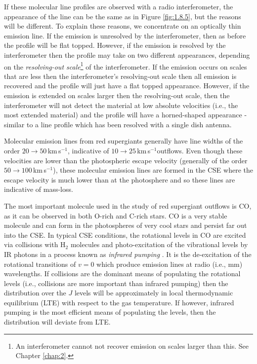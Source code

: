 If these molecular line profiles are observed with a radio interferometer, the appearance of the line can be the same as in Figure \ref{fig:1.8.5}, but the reasons will be different. To explain these reasons, we concentrate on an optically thin emission line. If the emission is unresolved by the interferometer, then as before the profile will be flat topped. However, if the emission is resolved by the interferometer then the profile may take on two different appearances, depending on the \textit{resolving-out scale}\footnote{ An interferometer cannot not recover emission on scales larger than this. See Chapter \ref{chap:2}.} of the interferometer. If the emission occurs on scales that are less then the interferometer's resolving-out scale then all emission is recovered and the profile will just have a flat topped appearance. However, if the emission is extended on scales larger then the resolving-out scale, then the interferometer will not detect the material at low absolute velocities (i.e., the most extended material) and the profile will have a horned-shaped appearance - similar to a line profile which has been resolved with a single dish antenna.

Molecular emission lines from red supergiants generally have line widths of the order $20\rightarrow 50$\,km\,s$^{-1}$, indicative of $10 \rightarrow 25$\,km\,s$^{-1} $outflows. Even though these velocities are lower than the photospheric escape velocity (generally of the order $50\rightarrow 100$\,km\,s$^{-1}$), these molecular emission lines are formed in the CSE where the escape velocity is much lower than at the photosphere and so these lines are indicative of mass-loss.

The most important molecule used in the study of red supergiant outflows is CO, as it can be observed in both O-rich and C-rich stars. CO is a very stable molecule and can form in the photospheres of very cool stars and persist far out into the CSE. In typical CSE conditions, the rotational levels in CO are excited via collisions with H$_{2}$ molecules and photo-excitation of the vibrational levels by IR photons in a process known as \textit{infrared pumping} \citep{lamers_1999}. It is the de-excitation of the rotational transitions of $v=0$ which produce emission lines at radio (i.e., mm) wavelengths. If collisions are the dominant means of populating the rotational levels (i.e., collisions are more important than infrared pumping) then the distribution over the $J$ levels will be approximately in local thermodynamic equilibrium (LTE) with respect to the gas temperature. If however, infrared pumping is the most efficient means of populating the levels, then the distribution will deviate from LTE. 

